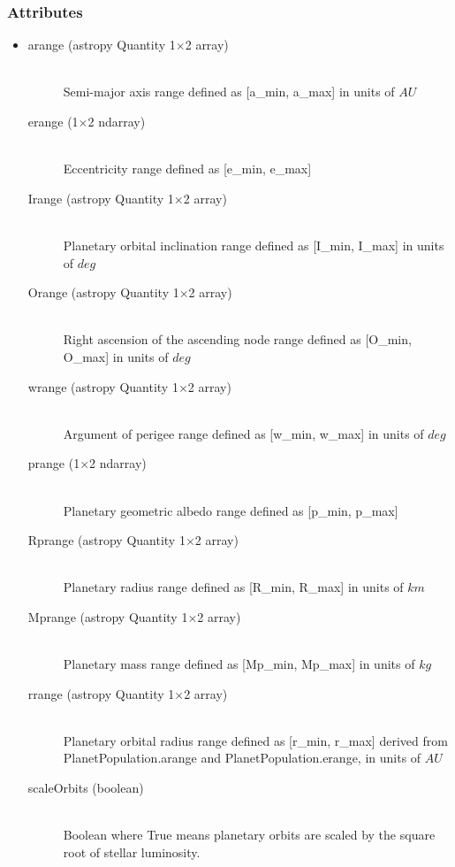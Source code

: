 \documentclass[cleanfoot]{asme2ej}
\begin{document}
\subsubsection*{Attributes}
\begin{itemize}
    \item
    \begin{description}
        \item[arange (astropy Quantity 1$\times$2 array)] \hfill \\
        Semi-major axis range defined as [a\_min, a\_max] in units of $ AU $
        \item[erange (1$\times$2 ndarray)] \hfill \\
        Eccentricity range defined as [e\_min, e\_max]
        \item[Irange (astropy Quantity 1$\times$2 array)] \hfill \\
        Planetary orbital inclination range defined as [I\_min, I\_max] in units of $ deg $
        \item[Orange (astropy Quantity 1$\times$2 array)] \hfill \\
        Right ascension of the ascending node range defined as [O\_min, O\_max] in units of $ deg $
        \item[wrange (astropy Quantity 1$\times$2 array)] \hfill \\
        Argument of perigee range defined as [w\_min, w\_max] in units of $ deg $
        \item[prange (1$\times$2 ndarray)] \hfill \\
        Planetary geometric albedo range defined as [p\_min, p\_max]
        \item[Rprange (astropy Quantity 1$\times$2 array)] \hfill \\
        Planetary radius range defined as [R\_min, R\_max] in units of $ km $
        \item[Mprange (astropy Quantity 1$\times$2 array)] \hfill \\
        Planetary mass range defined as [Mp\_min, Mp\_max] in units of $ kg $
        \item[rrange (astropy Quantity 1$\times$2 array)] \hfill \\
        Planetary orbital radius range defined as [r\_min, r\_max] derived from PlanetPopulation.arange and PlanetPopulation.erange, in units of $ AU $
        \item [scaleOrbits (boolean)] \hfill \\
        Boolean where True means planetary orbits are scaled by the square root of stellar luminosity.

\end{description}
\end{itemize}
\end{document}
